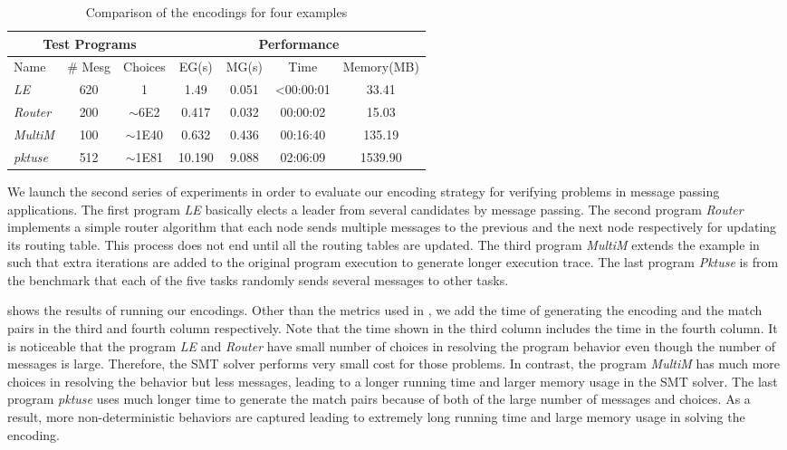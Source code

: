 \begin{table}
\begin{center}
\setlength{\tabcolsep}{2pt}
\scriptsize
\begin{tabular}{|l|c|c|c|c|c|c|}
		\hline
         \multicolumn{3}{|c|}{Test Programs} & \multicolumn{4}{|c|}{Performance} \\ \hline
         Name & \# Mesg & Choices & EG(s) & MG(s) & Time & Memory(MB) \\ \hline
         \textit{LE} & 620 & 1 & 1.49 & 0.051 & <00:00:01 & 33.41  \\
         \textit{Router} & 200 & $\sim$6E2 & 0.417 & 0.032 & 00:00:02 & 15.03  \\
         \textit{MultiM} & 100 & $\sim$1E40 & 0.632 & 0.436 &  00:16:40 & 135.19  \\
         \textit{pktuse} & 512 & $\sim$1E81 & 10.190 & 9.088 & 02:06:09 & 1539.90 \\
         \hline
		\end{tabular}
\end{center}
\caption{Comparison of the encodings for four examples}
\label{table:second}
\end{table}
We launch the second series of experiments in order to evaluate our encoding strategy for verifying problems in message passing applications. The first program \textit{LE} basically elects a leader from several candidates by message passing. The second program \textit{Router} implements a simple router algorithm that each node sends multiple messages to the previous and the next node respectively for updating its routing table. This process does not end until all the routing tables are updated. The third program \textit{MultiM} extends the example in  such that extra iterations are added to the original program execution to generate longer execution trace. The last program \textit{Pktuse} is from the benchmark \cite{mpptest_benchmark} that each of the five tasks randomly sends several messages to other tasks.

 shows the results of running our encodings. Other than the metrics used in , we add the time of generating the encoding and the match pairs in the third and fourth column respectively. Note that the time shown in the third column includes the time in the fourth column. It is noticeable that the program \textit{LE} and \textit{Router} have small number of choices in resolving the program behavior even though the number of messages is large. Therefore, the SMT solver performs very small cost for those problems. In contrast, the program \textit{MultiM} has much more choices in resolving the behavior but less messages, leading to a longer running time and larger memory usage in the SMT solver. The last program \textit{pktuse} uses much longer time to generate the match pairs because of both of the large number of messages and choices. As a result, more non-deterministic behaviors are captured leading to extremely long running time and large memory usage in solving the encoding.

